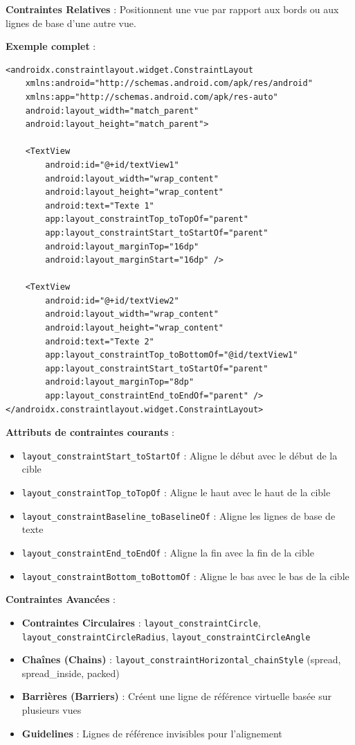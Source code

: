 \documentclass[11pt,a4paper]{article}
\begin{document}
\textbf{Contraintes Relatives} : Positionnent une vue par rapport aux bords ou aux lignes de base d'une autre vue.

\textbf{Exemple complet} :
\begin{lstlisting}[style=XML]
<androidx.constraintlayout.widget.ConstraintLayout
    xmlns:android="http://schemas.android.com/apk/res/android"
    xmlns:app="http://schemas.android.com/apk/res-auto"
    android:layout_width="match_parent"
    android:layout_height="match_parent">
    
    <TextView
        android:id="@+id/textView1"
        android:layout_width="wrap_content"
        android:layout_height="wrap_content"
        android:text="Texte 1"
        app:layout_constraintTop_toTopOf="parent"
        app:layout_constraintStart_toStartOf="parent"
        android:layout_marginTop="16dp"
        android:layout_marginStart="16dp" />
    
    <TextView
        android:id="@+id/textView2"
        android:layout_width="wrap_content"
        android:layout_height="wrap_content"
        android:text="Texte 2"
        app:layout_constraintTop_toBottomOf="@id/textView1"
        app:layout_constraintStart_toStartOf="parent"
        android:layout_marginTop="8dp"
        app:layout_constraintEnd_toEndOf="parent" />
</androidx.constraintlayout.widget.ConstraintLayout>
\end{lstlisting}

\textbf{Attributs de contraintes courants} :
\begin{itemize}
    \item \texttt{layout\_constraintStart\_toStartOf} : Aligne le début avec le début de la cible
    \item \texttt{layout\_constraintTop\_toTopOf} : Aligne le haut avec le haut de la cible
    \item \texttt{layout\_constraintBaseline\_toBaselineOf} : Aligne les lignes de base de texte
    \item \texttt{layout\_constraintEnd\_toEndOf} : Aligne la fin avec la fin de la cible
    \item \texttt{layout\_constraintBottom\_toBottomOf} : Aligne le bas avec le bas de la cible
\end{itemize}

\textbf{Contraintes Avancées} :
\begin{itemize}
    \item \textbf{Contraintes Circulaires} : \texttt{layout\_constraintCircle}, \texttt{layout\_constraintCircleRadius}, \texttt{layout\_constraintCircleAngle}
    \item \textbf{Chaînes (Chains)} : \texttt{layout\_constraintHorizontal\_chainStyle} (spread, spread\_inside, packed)
    \item \textbf{Barrières (Barriers)} : Créent une ligne de référence virtuelle basée sur plusieurs vues
    \item \textbf{Guidelines} : Lignes de référence invisibles pour l'alignement
\end{itemize}
\end{document}
